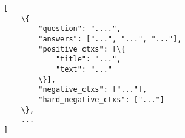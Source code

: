 \documentclass[preview,border=10pt]{standalone}
\begin{document}
\begin{Verbatim}[commandchars=\\\{\}, breaklines=true, breakanywhere=true]
[
	\{
		"question": "....",
		"answers": ["...", "...", "..."],
		"positive_ctxs": [\{
			"title": "...",
			"text": "..."
		\}],
		"negative_ctxs": ["..."],
		"hard_negative_ctxs": ["..."]
	\},
	...
]
\end{Verbatim}
\end{document}
